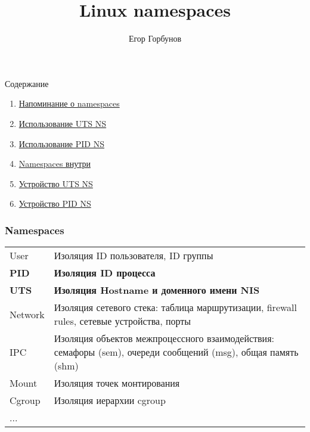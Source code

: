 
\makeatletter
{}
\makeatother
\graphicspath{{./fig/}}

\title{Linux namespaces}
\author[Егор Горбунов]{
	Егор Горбунов
}


\maketitle

\begin{frame}{Содержание}
\begin{large}
\begin{enumerate}
	\item \hyperlink{namespaces_overview}{Напоминание о namespaces}
	\item \hyperlink{uts_ns_usage}{Использование UTS NS}
	\item \hyperlink{pid_ns_usage}{Использование PID NS}
	\item \hyperlink{ns_internals}{Namespaces внутри}
	\item \hyperlink{uts_ns_inter}{Устройство UTS NS}
	\item \hyperlink{pid_ns_inter}{Устройство PID NS}
\end{enumerate}
\end{large}
\end{frame}

\begin{frame}[label={namespaces_overview}]
\frametitle{Namespaces}
\begin{tabular}{lp{9cm}}
	\alert{User} & Изоляция ID пользователя, ID группы \\
	\alert{\textbf{PID}} & \textbf{Изоляция ID процесса} \\
	\alert{\textbf{UTS}} & \textbf{Изоляция Hostname и доменного имени NIS} \\
	\alert{Network} & Изоляция сетевого стека: таблица маршрутизации, firewall rules, сетевые устройства, порты \\
	\alert{IPC} & Изоляция объектов межпроцессного взаимодействия: семафоры (sem), очереди сообщений (msg), общая память (shm) \\
	\alert{Mount} & Изоляция точек монтирования \\
	\alert{Cgroup} & Изоляция иерархии cgroup \\
	... & 
\end{tabular}
\end{frame}

